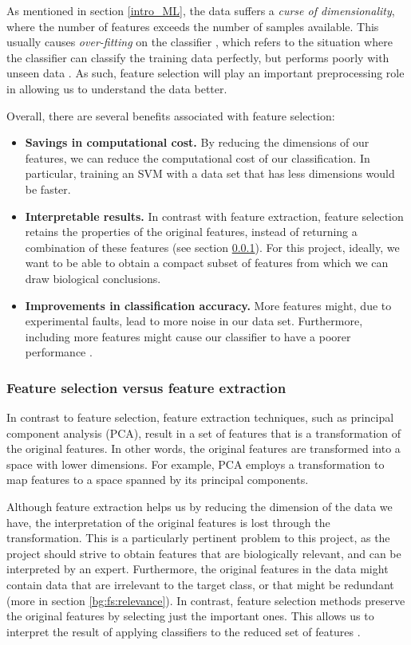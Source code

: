 \documentclass[12pt, twoside, a4paper]{article}
\begin{document}
As mentioned in section \ref{intro_ML}, the data suffers a \textit{curse of dimensionality}, where the number of features exceeds the number of samples available. This usually causes \textit{over-fitting} on the classifier \cite{RefWorks:115, RefWorks:175}, which refers to the situation where the classifier can classify the training data perfectly, but performs poorly with unseen data \cite{RefWorks:98}. As such, feature selection will play an important preprocessing role in allowing us to understand the data better.

Overall, there are several benefits associated with feature selection:
\begin{itemize}
  \item \textbf{Savings in computational cost.} By reducing the dimensions of our features, we can reduce the computational cost of our classification. In particular, training an SVM with a data set that has less dimensions would be faster.
  \item \textbf{Interpretable results.} In contrast with feature extraction, feature selection retains the properties of the original features, instead of returning a combination of these features (see section \ref{bg:fs:extraction}). For this project, ideally, we want to be able to obtain a compact subset of features from which we can draw biological conclusions.
  \item \textbf{Improvements in classification accuracy.} More features might, due to experimental faults, lead to more noise in our data set. Furthermore, including more features might cause our classifier to have a poorer performance \cite{RefWorks:174}.
\end{itemize}

\subsubsection{Feature selection versus feature extraction} \label{bg:fs:extraction}

In contrast to feature selection, feature extraction techniques, such as principal component analysis (PCA), result in a set of features that is a transformation of the original features. In other words, the original features are transformed into a space with lower dimensions. For example, PCA employs a transformation to map features to a space spanned by its principal components.

Although feature extraction helps us by reducing the dimension of the data we have, the interpretation of the original features is lost through the transformation. This is a particularly pertinent problem to this project, as the project should strive to obtain features that are biologically relevant, and can be interpreted by an expert. Furthermore, the original features in the data might contain data that are irrelevant to the target class, or that might be redundant (more in section \ref{bg:fs:relevance}). In contrast, feature selection methods preserve the original features by selecting just the important ones. This allows us to interpret the result of applying classifiers to the reduced set of features \cite{RefWorks:142}.
\end{document}
